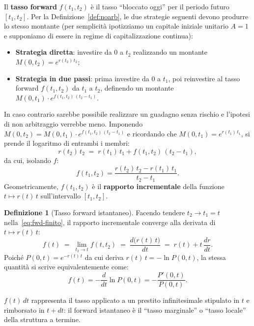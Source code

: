 \documentclass[11pt,a4paper]{article}
\theoremstyle{plain}
\theoremstyle{definition}
\newtheorem{definizione}[teorema]{Definizione}
\theoremstyle{remark}
\begin{document}
Il \textbf{tasso forward} $f(t_1, t_2)$ \`e il tasso ``bloccato oggi'' per il periodo
futuro $[t_1, t_2]$. Per la Definizione~\ref{def:noarb}, le due strategie seguenti devono
produrre lo stesso montante (per semplicità ipotizziamo un capitale iniziale unitario $A=1$ e supponiamo di essere in regime di capitalizzazione continua):
\begin{itemize}
  \item \textbf{Strategia diretta}: investire da $0$ a $t_2$ realizzando un montante $M(0,t_2) = e^{r(t_2)\,t_2}$;
  \item \textbf{Strategia in due passi}: prima investire da $0$ a $t_1$, poi reinvestire al
        tasso forward $f(t_1,t_2)$ da $t_1$ a $t_2$, definendo un montante
        $M(0,t_1)\cdot e^{f(t_1,t_2)\,(t_2-t_1)}$.
\end{itemize}
In caso contrario sarebbe possibile realizzare un guadagno senza rischio e l'ipotesi di non arbitraggio verrebbe meno. Imponendo $M(0,t_2) = M(0,t_1)\cdot e^{f(t_1,t_2)\,(t_2-t_1)}$ e ricordando che $M(0,t_1)=e^{r(t_1)\,t_1}$, si prende il logaritmo di entrambi i membri:
\[
  r(t_2)\,t_2 \;=\; r(t_1)\,t_1 + f(t_1,t_2)\,(t_2-t_1),
\]
da cui, isolando $f$:
\begin{equation}
  f(t_1, t_2) = \frac{r(t_2)\,t_2 - r(t_1)\,t_1}{t_2 - t_1}.
  \label{eq:fwd-finito}
\end{equation}
Geometricamente, $f(t_1,t_2)$ \`e il \textbf{rapporto incrementale} della funzione
$t\mapsto r(t)\,t$ sull'intervallo $[t_1,t_2]$.

\begin{definizione}[Tasso forward istantaneo]
\label{def:forward}
Facendo tendere $t_2 \to t_1 = t$ nella~\eqref{eq:fwd-finito}, il rapporto incrementale
converge alla derivata di $t\mapsto r(t)\,t$:
\begin{equation}
  f(t) \;=\; \lim_{t_2 \to t} f(t, t_2)
       \;=\; \frac{d\bigl(r(t)\,t\bigr)}{dt}
       \;=\; r(t) + t\,\frac{dr}{dt}.
  \label{eq:fwd-ist}
\end{equation}
Poich\'e $P(0,t)=e^{-r(t)\,t}$ da cui deriva $r(t)\,t=-\ln P(0,t)$, la stessa quantit\`a si
scrive equivalentemente come:
\[
  f(t) = -\frac{d}{dt}\ln P(0,t) = -\frac{P'(0,t)}{P(0,t)}.
\]
\end{definizione}

$f(t)\,dt$ rappresenta il tasso applicato a un prestito infinitesimale stipulato in $t$
e rimborsato in $t+dt$: il forward istantaneo \`e il ``tasso marginale'' o ``tasso locale''
della struttura a termine.
\end{document}

